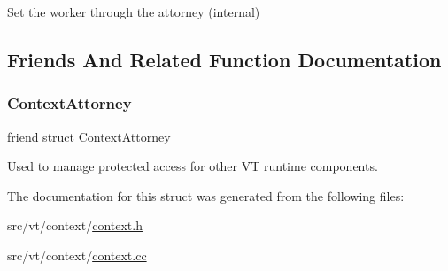 Set the worker through the attorney (internal) 



\subsection{Friends And Related Function Documentation}
\mbox{\label{structvt_1_1ctx_1_1_context_a75c33a90ea59b21ab5375343af0f8e26}} 
\subsubsection{\texorpdfstring{Context\+Attorney}{ContextAttorney}}
{\footnotesize\ttfamily friend struct \hyperlink{structvt_1_1ctx_1_1_context_attorney}{Context\+Attorney}\hspace{0.3cm}{\ttfamily [friend]}}



Used to manage protected access for other VT runtime components. 



The documentation for this struct was generated from the following files\+:\begin{DoxyCompactItemize}
\item 
src/vt/context/\hyperlink{context_8h}{context.\+h}\item 
src/vt/context/\hyperlink{context_8cc}{context.\+cc}\end{DoxyCompactItemize}
